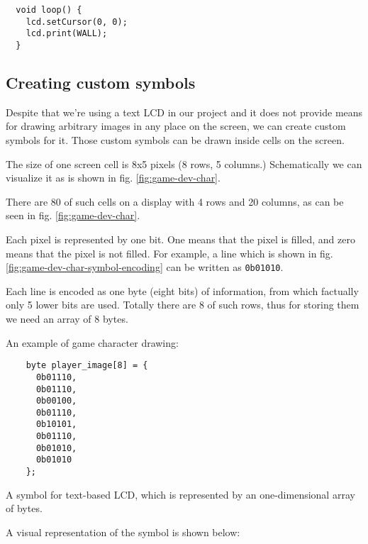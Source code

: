 \documentclass[../sparc.tex]{subfiles}
\begin{document}
\begin{verbatim}
  void loop() {
    lcd.setCursor(0, 0);
    lcd.print(WALL);
  }
\end{verbatim}

\subsection{Creating custom symbols}

Despite that we're using a text LCD in our project and it does not provide means
for drawing arbitrary images in any place on the screen, we can create custom
symbols for it.  Those custom symbols can be drawn inside cells on the screen.

The size of one screen cell is 8x5 pixels (8 rows, 5 columns.)  Schematically we
can visualize it as is shown in fig. \ref{fig:game-dev-char}.


There are 80 of such cells on a display with 4 rows and 20 columns, as can be
seen in fig. \ref{fig:game-dev-char}.

Each pixel is represented by one bit.  One means that the pixel is filled, and
zero means that the pixel is not filled.  For example, a line which is shown in
fig. \ref{fig:game-dev-char-symbol-encoding} can be written as
\texttt{0b01010}.


Each line is encoded as one byte (eight bits) of information, from which
factually only 5 lower bits are used.  Totally there are 8 of such rows, thus
for storing them we need an array of 8 bytes.

An example of game character drawing:

\begin{listing}[H]
  \begin{verbatim}
    byte player_image[8] = {
      0b01110,
      0b01110,
      0b00100,
      0b01110,
      0b10101,
      0b01110,
      0b01010,
      0b01010
    };
  \end{verbatim}
  \caption{A symbol for text-based LCD, which is represented by an
    one-dimensional array of bytes.}
  \label{listing:game-dev-lcd-custom-char}
\end{listing}

A visual representation of the symbol is shown below:
\end{document}
